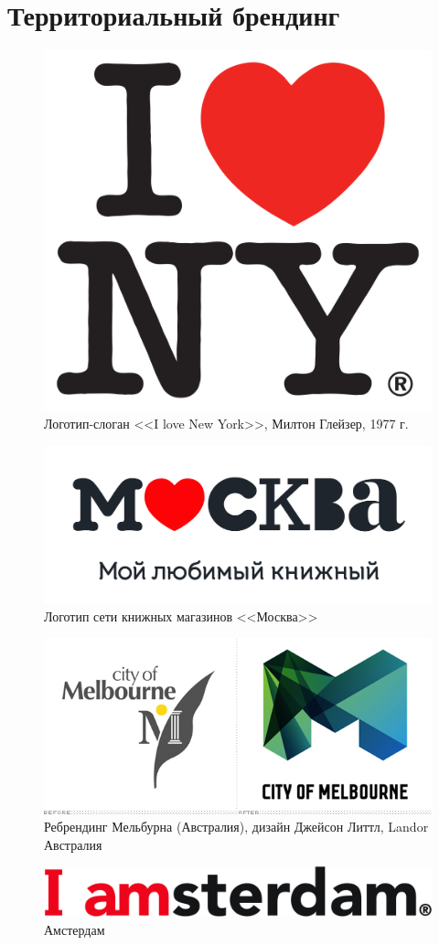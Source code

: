 \section{Территориальный брендинг}
\label{app:territorial}

\begin{figure}[ht]
  \centering
  \includegraphics[width=.5\linewidth]{images/supplement/territorial/ny}
  \caption{Логотип-слоган <<I love New York>>, Милтон Глейзер, 1977 г.}
  \label{fig:territorial:ny}
\end{figure}

\begin{figure}[ht]
  \centering
  \includegraphics[width=.5\linewidth]{images/supplement/territorial/moscow}
  \caption{Логотип сети книжных магазинов <<Москва>>}
  \label{fig:territorial:moscow}
\end{figure}

\begin{figure}[ht]
  \centering
  \includegraphics[width=.5\linewidth]{images/supplement/territorial/melbourne}
  \caption{Ребрендинг Мельбурна (Австралия), дизайн Джейсон Литтл, Landor Австралия}
  \label{fig:territorial:melbourne}
\end{figure}

\begin{figure}[ht]
  \centering
  \includegraphics[width=.5\linewidth]{images/supplement/territorial/amsterdam}
  \caption{Амстердам}
  \label{fig:territorial:amsterdam}
\end{figure}

